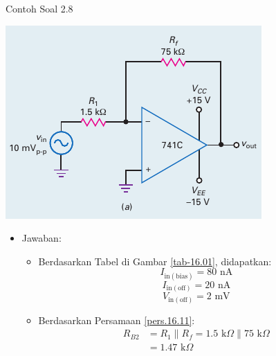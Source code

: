\begin{frame}[t]{Contoh Soal 2.8}
	\begin{multicols}{2}
		\begin{center}
			\includegraphics[width=\linewidth]{gambar/fig-16.17a}
		\end{center}
		\columnbreak
		\begin{itemize}
			\item Jawaban:
			\begin{itemize}
				\item Berdasarkan Tabel di Gambar \ref{tab-16.01}, didapatkan:
				\[ I_{\text{in}(\text{bias})} = 80 \text{ nA} \]
				\[ I_{\text{in}(\text{off})} = 20 \text{ nA} \]
				\[ V_{\text{in}(\text{off})} = 2 \text{ mV} \]
				\item Berdasarkan Persamaan \ref{pers.16.11}:
				\begin{align*}
					R_{B2} &= R_1 \parallel R_f = 1.5 \text{ k}\Omega \parallel 75 \text{ k}\Omega \\
					&= 1.47 \text{ k}\Omega
				\end{align*}
			\end{itemize}
		\end{itemize}
	\end{multicols}
\end{frame}

